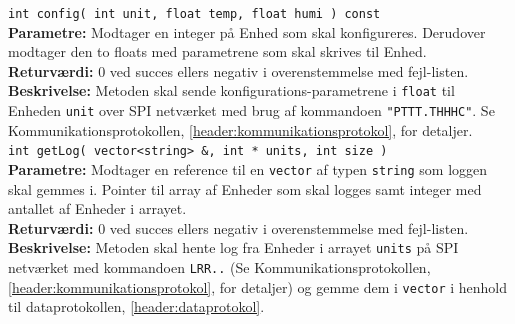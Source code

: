 \verb+int config( int unit, float temp, float humi ) const +\\
\textbf{Parametre:} Modtager en integer på Enhed som skal konfigureres. Derudover modtager den to floats med parametrene som skal skrives til Enhed. \\
\textbf{Returværdi:}  0 ved succes ellers negativ i overenstemmelse med fejl-listen.   \\
\textbf{Beskrivelse:} Metoden skal sende konfigurations-parametrene i \verb+float+ til Enheden \verb+unit+ over SPI netværket med brug af kommandoen \verb+"PTTT.THHHC"+. Se Kommunikationsprotokollen, \ref{header:kommunikationsprotokol}, for detaljer.\\

\verb+int getLog( vector<string> &, int * units, int size )+ \\
\textbf{Parametre:}  Modtager en reference til en \verb+vector+ af typen \verb+string+ som loggen skal gemmes i. Pointer til array af Enheder som skal logges samt integer med antallet af Enheder i arrayet. \\
\textbf{Returværdi:}  0 ved succes ellers negativ i overenstemmelse med fejl-listen.   \\
\textbf{Beskrivelse:} Metoden skal hente log fra Enheder i arrayet \verb+units+ på SPI netværket med kommandoen \verb+LRR..+ (Se Kommunikationsprotokollen, \ref{header:kommunikationsprotokol}, for detaljer) og gemme dem i \verb+vector+ i henhold til dataprotokollen, \ref{header:dataprotokol}. \\
